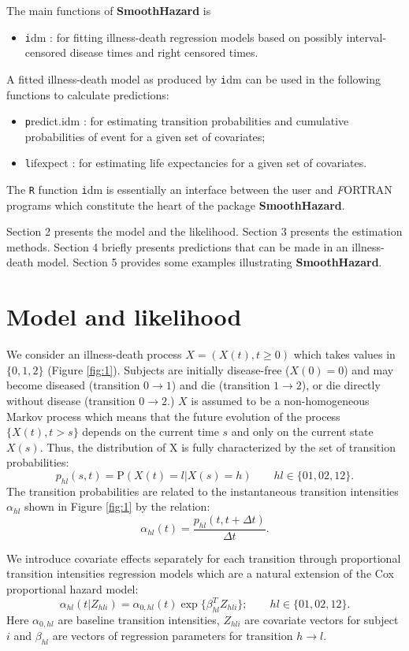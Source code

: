 \documentclass{article}
\newcommand{\pkg}[1]{{\bf #1}}
\newcommand{\code}[1]{{\texttt #1}}
\newcommand{\proglang}[1]{{\textsl #1}}
\begin{document}
The main functions of \pkg{SmoothHazard} is
\begin{itemize}
\item \code{idm} : for fitting illness-death regression models based on possibly interval-censored disease times and right censored times.
\end{itemize}
 A fitted illness-death model as produced
by \code{idm} can be used in the following functions to calculate predictions: 
\begin{itemize}
\item \code{predict.idm} : for estimating transition probabilities and cumulative probabilities of event for a given set of covariates;
\item \code{lifexpect} : for estimating life expectancies for a given set of covariates.
\end{itemize}

The \code{R} function \code{idm} is essentially an interface between 
the user
and \proglang{FORTRAN} programs which constitute the heart of the
package \pkg{SmoothHazard}.

Section 2 presents the model and the likelihood.
Section 3 presents the estimation methods.
Section 4 briefly presents predictions that can be made in an illness-death model. 
Section 5 provides some examples illustrating \pkg{SmoothHazard}.
\section{Model and likelihood}
\label{sec-2}

We consider an illness-death process $X=(X(t),t \geq 0)$ which takes
values in $\{0,1,2\}$ (Figure \ref{fig:1}). Subjects are initially
disease-free ($X(0)=0$) and may become diseased (transition $0
\rightarrow 1$) and die (transition $1 \rightarrow 2$), or die
directly without disease (transition $0 \rightarrow 2$.)  $X$ is
assumed to be a non-homogeneous Markov process which means that the
future evolution of the process $\{X(t),t>s\}$ depends on the current
time $s$ and only on the current state $X(s)$. Thus, the distribution
of X is fully characterized by the set of transition probabilities: $$
p_{hl}(s,t)=\textrm{P}(X(t)=l|X(s)=h)\qquad hl \in \{01,02,12\}.$$ The
transition probabilities are related to the instantaneous transition
intensities $\alpha_{hl}$ shown in Figure \ref{fig:1} by the relation:
$$ \alpha_{hl}(t)=\frac{p_{hl}(t,t+\Delta t)}{\Delta t}.$$

We introduce covariate effects separately for each transition through
proportional transition intensities regression models which are a
natural extension of the Cox proportional hazard model:
\begin{equation}
\alpha_{hl}(t|Z_{hli})=\alpha_{0,hl}(t)\exp\{\beta_{hl}^T Z_{hli}\};\qquad hl \in \{01,02,12\}.
\end{equation}
Here $\alpha_{0,hl}$ are baseline transition intensities, $Z_{hli}$
are covariate vectors for subject $i$ and $\beta_{hl}$ are vectors of
regression parameters for transition $h \rightarrow l$.
\end{document}

